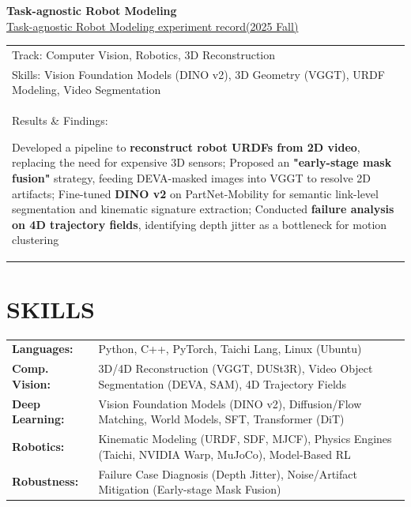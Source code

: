 \documentclass[a4paper,9pt]{extarticle}
\begin{document}
    \textbf{\Large Task-agnostic Robot Modeling} \\
    \href{https://github.com/JacobGIT2/TraceAnything/blob/main/Task_agnostic_Robot_Modeling_experiment_record__2025_Fall_.pdf}{Task-agnostic Robot Modeling experiment record(2025 Fall)} \\
    \vspace{2pt} 
    \noindent
    \begin{tabular}{@{$\circ$\hspace{0.5em}} l}
        Track: Computer Vision, Robotics, 3D Reconstruction \\
        Skills: Vision Foundation Models (DINO v2), 3D Geometry (VGGT), URDF Modeling, Video Segmentation \\
        Results \& Findings:
        \parbox[t]{0.85\textwidth}
        {Developed a pipeline to \textbf{reconstruct robot URDFs from 2D video}, replacing the need for expensive 3D sensors;
        Proposed an \textbf{"early-stage mask fusion"} strategy, feeding DEVA-masked images into VGGT to resolve 2D artifacts;
        Fine-tuned \textbf{DINO v2} on PartNet-Mobility for semantic link-level segmentation and kinematic signature extraction;
        Conducted \textbf{failure analysis on 4D trajectory fields}, identifying depth jitter as a bottleneck for motion clustering}
    \end{tabular}
\section*{SKILLS}
\begin{tabularx}{\textwidth}{@{$\circ$\hspace{0.5em}} >{\bfseries}l X}
    Languages: & Python, C++, PyTorch, Taichi Lang, Linux (Ubuntu) \\
    Comp. Vision: & 3D/4D Reconstruction (VGGT, DUSt3R), Video Object Segmentation (DEVA, SAM), 4D Trajectory Fields \\
    Deep Learning: & Vision Foundation Models (DINO v2), Diffusion/Flow Matching, World Models, SFT, Transformer (DiT) \\
    Robotics: & Kinematic Modeling (URDF, SDF, MJCF), Physics Engines (Taichi, NVIDIA Warp, MuJoCo), Model-Based RL \\
    Robustness: & Failure Case Diagnosis (Depth Jitter), Noise/Artifact Mitigation (Early-stage Mask Fusion)
\end{tabularx}
\end{document}
